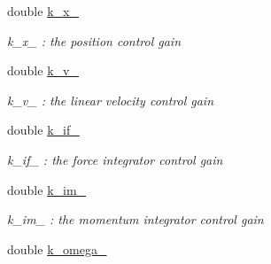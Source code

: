 \begin{DoxyCompactItemize}
\item 
\hypertarget{class_pose_controller_node_abf44be9625bf37e8cddc8e96eab4a04c}{double \hyperlink{class_pose_controller_node_abf44be9625bf37e8cddc8e96eab4a04c}{k\-\_\-x\-\_\-}}\label{class_pose_controller_node_abf44be9625bf37e8cddc8e96eab4a04c}

\begin{DoxyCompactList}\small\item\em k\-\_\-x\-\_\- \-: the position control gain \end{DoxyCompactList}\item 
\hypertarget{class_pose_controller_node_ae2502f9a4bcef6e07a4755c1fc5f1a2d}{double \hyperlink{class_pose_controller_node_ae2502f9a4bcef6e07a4755c1fc5f1a2d}{k\-\_\-v\-\_\-}}\label{class_pose_controller_node_ae2502f9a4bcef6e07a4755c1fc5f1a2d}

\begin{DoxyCompactList}\small\item\em k\-\_\-v\-\_\- \-: the linear velocity control gain \end{DoxyCompactList}\item 
\hypertarget{class_pose_controller_node_ac9c15e0553bbda77ae87c289060b716d}{double \hyperlink{class_pose_controller_node_ac9c15e0553bbda77ae87c289060b716d}{k\-\_\-if\-\_\-}}\label{class_pose_controller_node_ac9c15e0553bbda77ae87c289060b716d}

\begin{DoxyCompactList}\small\item\em k\-\_\-if\-\_\- \-: the force integrator control gain \end{DoxyCompactList}\item 
\hypertarget{class_pose_controller_node_a74b20a576114b4100de33d36256d91d4}{double \hyperlink{class_pose_controller_node_a74b20a576114b4100de33d36256d91d4}{k\-\_\-im\-\_\-}}\label{class_pose_controller_node_a74b20a576114b4100de33d36256d91d4}

\begin{DoxyCompactList}\small\item\em k\-\_\-im\-\_\- \-: the momentum integrator control gain \end{DoxyCompactList}\item 
\hypertarget{class_pose_controller_node_a8bf889f03f57b8647081038be335380c}{double \hyperlink{class_pose_controller_node_a8bf889f03f57b8647081038be335380c}{k\-\_\-omega\-\_\-}}\label{class_pose_controller_node_a8bf889f03f57b8647081038be335380c}


\end{DoxyCompactItemize}
